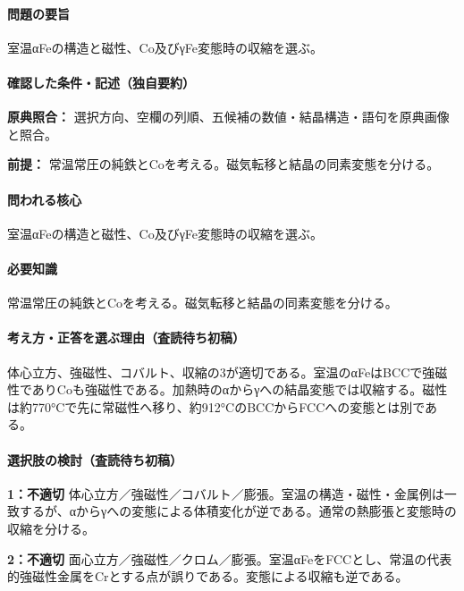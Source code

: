 \paragraph{問題の要旨} 室温αFeの構造と磁性、Co及びγFe変態時の収縮を選ぶ。

\paragraph{確認した条件・記述（独自要約）}\mbox{}\par

\noindent\textbf{原典照合：} 選択方向、空欄の列順、五候補の数値・結晶構造・語句を原典画像と照合。\par

\noindent\textbf{前提：} 常温常圧の純鉄とCoを考える。磁気転移と結晶の同素変態を分ける。\par

\paragraph{問われる核心} 室温αFeの構造と磁性、Co及びγFe変態時の収縮を選ぶ。

\paragraph{必要知識} 常温常圧の純鉄とCoを考える。磁気転移と結晶の同素変態を分ける。

\paragraph{考え方・正答を選ぶ理由（査読待ち初稿）} 体心立方、強磁性、コバルト、収縮の3が適切である。室温のαFeはBCCで強磁性でありCoも強磁性である。加熱時のαからγへの結晶変態では収縮する。磁性は約770°Cで先に常磁性へ移り、約912°CのBCCからFCCへの変態とは別である。

\paragraph{選択肢の検討（査読待ち初稿）}\mbox{}\par

\noindent\textbf{1：不適切} 体心立方／強磁性／コバルト／膨張。室温の構造・磁性・金属例は一致するが、αからγへの変態による体積変化が逆である。通常の熱膨張と変態時の収縮を分ける。\par

\noindent\textbf{2：不適切} 面心立方／強磁性／クロム／膨張。室温αFeをFCCとし、常温の代表的強磁性金属をCrとする点が誤りである。変態による収縮も逆である。\par

